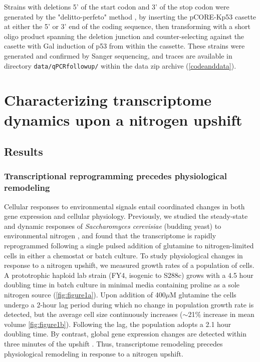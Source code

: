 Strains with deletions 5' of the start codon and 3' of the stop
codon were generated by the "delitto-perfeto" 
method \parencite{storici2006delitto}, 
by inserting the pCORE-Kp53 casette
at either the 5' or 3' end of the coding sequence, then transforming
with a short oligo product spanning the deletion junction and
counter-selecting against the casette with Gal induction of p53 
from within the cassette.
These strains were generated and confirmed by Sanger sequencing,
and traces are available in directory \texttt{data/qPCRfollowup/} 
within the data zip archive (\autoref{codeanddata}).


\section{Characterizing transcriptome dynamics upon a nitrogen upshift}

\subsection{Results}

\subsubsection{Transcriptional reprogramming precedes physiological remodeling}

Cellular responses to environmental signals entail coordinated changes
in both gene expression and cellular physiology.  Previously, we
studied the steady-state and dynamic responses of 
\textit{Saccharomyces cerevisiae} 
(budding yeast) to environmental nitrogen
\parencite{airoldi2016steady}, and found that the transcriptome is rapidly
reprogrammed following a single pulsed addition of glutamine to
nitrogen-limited cells in either a chemostat or
batch culture. To study physiological changes in response to a
nitrogen upshift, we measured growth rates of a population of 
cells. A prototrophic haploid lab strain 
(FY4, isogenic to S288c) grows with a
4.5 hour doubling time in batch culture in minimal media 
containing proline as a sole
nitrogen source (\autoref{fig:figure1a}). Upon addition of 400$\mu$M glutamine
the cells undergo a 2-hour lag period during which no change in
population growth rate is detected, but the average cell size
continuously increases ($\sim$21\% increase in mean volume 
\autoref{fig:figure1b}). Following the lag, the population adopts a 2.1 
hour doubling time.
By contrast, global gene expression changes are detected
within three minutes of the upshift \parencite{airoldi2016steady}. 
Thus, transcriptome remodeling precedes
physiological remodeling in response to a nitrogen upshift.


